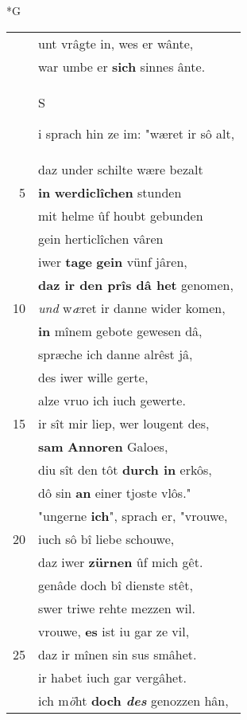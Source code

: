 \documentclass[8pt,a4paper,notitlepage]{article}
\begin{document}
\begin{table}[ht]
\begin{minipage}[t]{0.5\linewidth}
\small
\begin{center}*G
\end{center}
\begin{tabular}{rl}
 & unt vrâgte in, wes er wânte,\\ 
 & war umbe er \textbf{sich} sinnes ânte.\\ 
 & \begin{large}S\end{large}i sprach hin ze im: "wæret ir sô alt,\\ 
 & daz under schilte wære bezalt\\ 
5 & \textbf{in} \textbf{werdiclîchen} stunden\\ 
 & mit helme ûf houbt gebunden\\ 
 & gein herticlîchen vâren\\ 
 & iwer \textbf{tage} \textbf{gein} vünf jâren,\\ 
 & \textbf{daz ir den prîs dâ het} genomen,\\ 
10 & \textit{und} w\textit{æ}ret ir danne wider komen,\\ 
 & \textbf{in} mînem gebote gewesen dâ,\\ 
 & spræche ich danne alrêst jâ,\\ 
 & des iwer wille gerte,\\ 
 & alze vruo ich iuch gewerte.\\ 
15 & ir sît mir liep, wer lougent des,\\ 
 & \textbf{sam} \textbf{Annoren} Galoes,\\ 
 & diu sît den tôt \textbf{durch in} erkôs,\\ 
 & dô sin \textbf{an} einer tjoste vlôs."\\ 
 & "ungerne \textbf{ich}", sprach er, "vrouwe,\\ 
20 & iuch sô bî liebe schouwe,\\ 
 & daz iwer \textbf{zürnen} ûf mich gêt.\\ 
 & genâde doch bî dienste stêt,\\ 
 & swer triwe rehte mezzen wil.\\ 
 & vrouwe, \textbf{es} ist iu gar ze vil,\\ 
25 & daz ir mînen sin sus smâhet.\\ 
 & ir habet iuch gar vergâhet.\\ 
 & ich m\textit{ö}ht \textbf{doch \textit{des}} genozzen hân,\\ 

\end{tabular}
\end{minipage}
\end{table}
\end{document}
